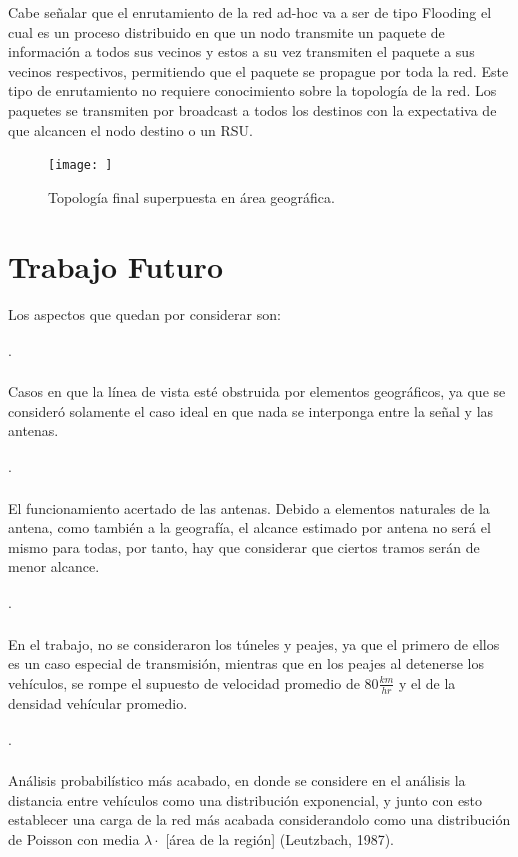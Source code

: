 \documentclass[12pt]{article}
\begin{document}
Cabe señalar que el enrutamiento de la red ad-hoc va a ser de tipo Flooding el cual es un proceso 
distribuido en que un nodo transmite un paquete de información a todos sus vecinos y estos a su vez 
transmiten el paquete a sus vecinos respectivos, permitiendo que el paquete se propague por toda la red. 
Este tipo de enrutamiento no requiere conocimiento sobre la topología de la red. Los paquetes se 
transmiten por broadcast a todos los destinos con la expectativa de que alcancen el nodo destino o un RSU.

\begin{figure}[H]
  \centering
      \texttt{[image: ]}
	    \caption{Topología final superpuesta en área geográfica.}
	\label{fig:top_final}
\end{figure}

\newpage
\section{Trabajo Futuro}
Los aspectos que quedan por considerar son:\\
\paragraph{$\cdot$}Casos en que la línea de vista esté obstruida por elementos geográficos, ya que se 
consideró solamente el caso ideal en que nada se interponga entre la señal y las antenas.
\paragraph{$\cdot$}El funcionamiento acertado de las antenas. Debido a elementos naturales de la antena, 
como también a la geografía, el alcance estimado por antena no será el mismo para todas, por tanto, hay 
que considerar que ciertos tramos serán de menor alcance.
\paragraph{$\cdot$}En el trabajo, no se consideraron los túneles y peajes, ya que el primero de ellos es 
un caso especial de transmisión, mientras que en los peajes al detenerse los vehículos, se rompe el 
supuesto de velocidad promedio de $80 \frac{km}{hr}$ y el de la densidad vehícular promedio.
\paragraph{$\cdot$}Análisis probabilístico más acabado, en donde se considere en el análisis la distancia 
entre vehículos como una distribución exponencial, y junto con esto establecer una carga de la red más 
acabada considerandolo como una distribución de Poisson con media $\lambda \cdot$ [área de la región] 
(Leutzbach, 1987).
\end{document}
